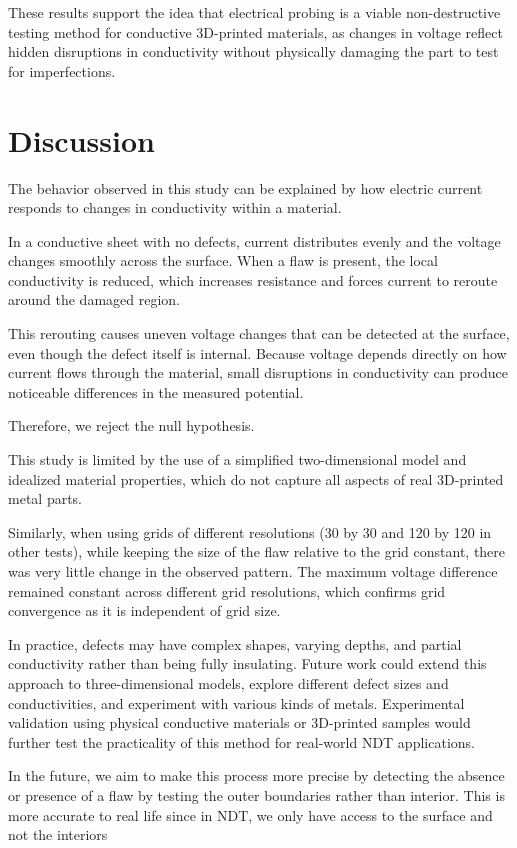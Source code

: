 \documentclass[reprint,amsmath,amssymb,aps]{revtex4-2}
\begin{document}
These results support the idea that electrical probing is a viable non-destructive testing method for conductive 3D-printed materials, as changes in voltage reflect hidden disruptions in conductivity without physically damaging the part to test for imperfections. 


\section{Discussion}

The behavior observed in this study can be explained by how electric current responds to changes in conductivity within a material.

In a conductive sheet with no defects, current distributes evenly and the voltage changes smoothly across the surface. When a flaw is present, the local conductivity is reduced, which increases resistance and forces current to reroute around the damaged region. 

This rerouting causes uneven voltage changes that can be detected at the surface, even though the defect itself is internal. Because voltage depends directly on how current flows through the material, small disruptions in conductivity can produce noticeable differences in the measured potential. 

Therefore, we reject the null hypothesis.

This study is limited by the use of a simplified two-dimensional model and idealized material properties, which do not capture all aspects of real 3D-printed metal parts. 

Similarly, when using grids of different resolutions (30 by 30 and 120 by 120 in other tests), while keeping the size of the flaw relative to the grid constant, there was very little change in the observed pattern. The maximum voltage difference remained constant across different grid resolutions, which confirms grid convergence as it is independent of grid size.

In practice, defects may have complex shapes, varying depths, and partial conductivity rather than being fully insulating. Future work could extend this approach to three-dimensional models, explore different defect sizes and conductivities, and experiment with various kinds of metals. Experimental validation using physical conductive materials or 3D-printed samples would further test the practicality of this method for real-world NDT applications. 

In the future, we aim to make this process  more precise by detecting the absence or presence of a flaw by testing the outer boundaries rather than interior. This is more accurate to real life since in NDT, we only have access to the surface and not the interiors
\end{document}
